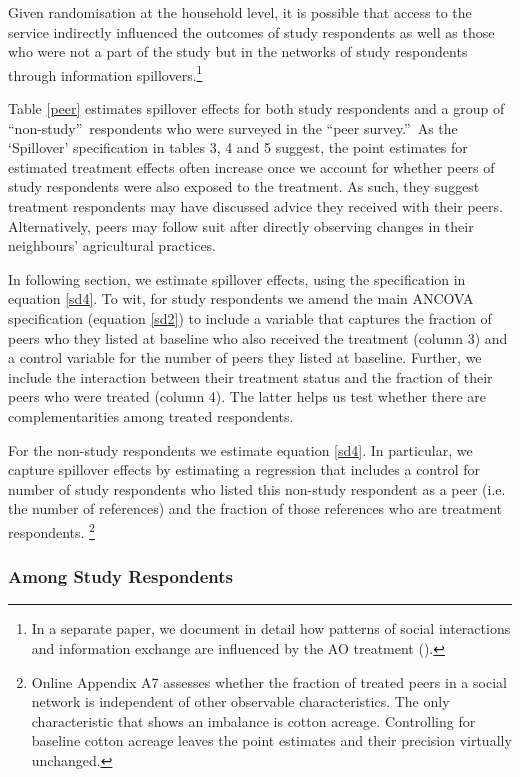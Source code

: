 \documentclass[12pt]{article}
\begin{document}
{{\normalsize Given randomisation at the household level, it is possible that
access to the service indirectly influenced the outcomes of study
respondents as well as those who were not a part of the study but in the
networks of study respondents through information spillovers.\footnote{In a separate paper, we document in detail how patterns of
social interactions and information exchange are influenced by the AO
treatment (\citealp{Fernando2016sotech}).}}

{\normalsize Table \ref{peer} estimates spillover effects for both study
respondents and a group of \textquotedblleft non-study\textquotedblright\
respondents who were surveyed in the \textquotedblleft peer
survey.\textquotedblright\ As the `Spillover' specification in tables 3, 4 and 5 suggest, the point estimates for estimated treatment effects often increase once we account for whether peers of study respondents were also exposed to the treatment. As such, they suggest treatment respondents may have discussed advice they received with their peers. Alternatively, peers may follow suit after directly observing changes in their neighbours' agricultural practices. }

In following section, we estimate spillover effects, using the specification in  
equation \eqref{sd4}. To wit, for study respondents we amend the main ANCOVA specification (equation \eqref{sd2}) to include a variable that captures the fraction of peers who they listed at baseline who also received the treatment (column 3) and a control variable for the number of peers they listed at baseline. Further, we include the interaction between their treatment status and the fraction of their peers who were treated (column 4). The latter helps us test whether there are complementarities among treated respondents.

For the non-study respondents we estimate equation \eqref{sd4}. In particular, we capture spillover effects by estimating a regression that includes a control for number of study respondents who listed this non-study respondent as a peer (i.e. the number of references) and the fraction of those references who are treatment respondents.  \footnote{%
Online Appendix A7 assesses whether the fraction of treated peers in a social
network is independent of other observable characteristics. The only
characteristic that shows an imbalance is cotton acreage. Controlling for baseline cotton acreage leaves the point estimates and their precision virtually unchanged.} }

\subsubsection{\protect\normalsize Among Study Respondents}
\end{document}
